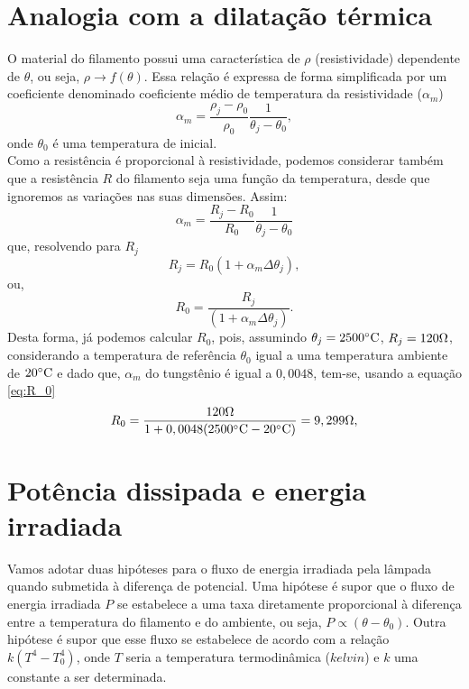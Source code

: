 \documentclass[12pt]{article}
\begin{document}
\section{Analogia com a dilatação térmica}
O material do filamento possui uma característica de $\rho$ (resistividade) dependente de $\theta$, ou seja, $\rho \rightarrow f(\theta)$.
Essa relação é expressa de forma simplificada por um coeficiente denominado coeficiente médio de temperatura da resistividade ($\alpha_m$)
\cite{halliday1995LTC}
\begin{equation}
    \alpha_m=\frac{\rho_j-\rho_0}{\rho_0}\frac{1}{\theta_j-\theta_0},
    \label{eq:resist}
\end{equation} 
onde $\theta_0$ é uma temperatura de inicial.\\ 
Como a resistência é proporcional à resistividade, podemos considerar também que a resistência $R$ do filamento seja uma função da temperatura, desde que ignoremos as variações nas suas dimensões. Assim:
\begin{equation}
    \alpha_{m}=\frac{R_j-R_0}{R_0}\frac{1}{\theta_j-\theta_0}
\end{equation}
que, resolvendo para $R_j$
\begin{equation}
    R_j=R_0(1+\alpha_m\Delta\theta_j),
    \label{eq:R_novo}
\end{equation}
ou,
\begin{equation}
    R_0=\frac{R_j}{(1+\alpha_m\Delta\theta_j)}.
    \label{eq:R_0}
\end{equation}
Desta forma, já podemos calcular $R_0$, pois, assumindo $\theta_j=2500\celsius$,  $R_j=120\ohm$, considerando a temperatura de referência $\theta_0$ igual a uma temperatura ambiente de $20\celsius$ e dado que, $\alpha_m$ do tungstênio é igual a $0,0048$, tem-se, usando a equação \ref{eq:R_0}
\begin{equation}
   R_0=\frac{120\ohm}{1+0,0048(2500\celsius-20\celsius)}=9,299\ohm,
\end{equation}
\section{Potência dissipada e energia irradiada }
Vamos adotar duas hipóteses para o fluxo de energia irradiada pela lâmpada quando submetida à diferença de potencial. Uma hipótese é supor que o fluxo de energia irradiada $P$ se estabelece a uma taxa diretamente proporcional à diferença entre a temperatura do filamento e do ambiente, ou seja, $P\propto(\theta-\theta_0)$. Outra hipótese é supor que esse fluxo se estabelece de acordo com a relação $k(T^4-T^{4}_0)$, onde $T $ seria a temperatura termodinâmica ($kelvin$) e $k$ uma constante a ser determinada.
\end{document}
